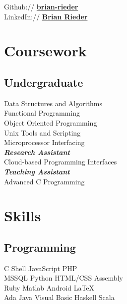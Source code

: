 \documentclass[letterpaper]{deedy-resume} %
\begin{document}
\begin{minipage}[t]{0.33\textwidth}
Github:// \href{https://github.com/brian-rieder}{\bf brian-rieder} \\
LinkedIn:// \href{https://www.linkedin.com/in/debarghyadas}{\bf Brian Rieder} 

\sectionspace %


\section{Coursework}

\subsection{Undergraduate}

Data Structures and Algorithms \\
Functional Programming \\
Object Oriented Programming \\
Unix Tools and Scripting \\
Microprocessor Interfacing \\
{\footnotesize \textit{\textbf{Research Assistant}}} \\
Cloud-based Programming Interfaces \\
{\footnotesize \textit{\textbf{Teaching Assistant}}} \\
Advanced C Programming

\sectionspace %


\section{Skills}

\subsection{Programming}

C \textbullet{} Shell \textbullet{} JavaScript \textbullet{} PHP \\
MSSQL \textbullet{} Python \textbullet{} HTML/CSS \textbullet{} Assembly \\
Ruby \textbullet{} Matlab \textbullet{} Android \textbullet{} \LaTeX\ \\
Ada \textbullet{} Java \textbullet{} Visual Basic \textbullet{} Haskell \textbullet{} Scala


\end{minipage}
\end{document}
